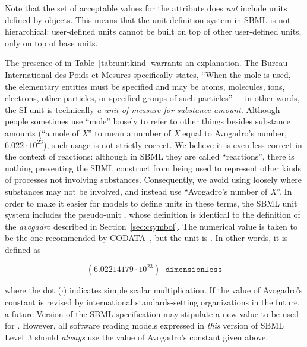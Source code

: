 Note that the set of acceptable values for the attribute
 does \emph{not} include units defined by
\UnitDefinition objects.  This means that the unit definition
system in SBML is not hierarchical: user-defined units cannot be
built on top of other user-defined units, only on top of base
units.

The presence of  in Table~\ref{tab:unitkind}
warrants an explanation.  The Bureau International des Poids et
Mesures specifically states, ``When the mole is used, the
elementary entities must be specified and may be atoms, molecules,
ions, electrons, other particles, or specified groups of such
particles''~\cite[p.~115]{bipm:2006}---in other words, the SI unit
 is technically \emph{a unit of measure for substance
  amount}.  Although people sometimes use ``mole'' loosely to
refer to other things besides substance amounts (\eg ``a mole of
\emph{X}'' to mean a number of \emph{X} equal to Avogadro's
number, $6.022 \cdot 10^{23}$), such usage is not strictly
correct.  We believe it is even less correct in the context of
reactions: although in SBML they are called ``reactions'', there
is nothing preventing the SBML \Reaction construct from being used
to represent other kinds of processes not involving substances.
Consequently, we avoid using  loosely where substances
may not be involved, and instead use ``Avogadro's number of
\emph{X}''.  In order to make it easier for models to define units
in these terms, the SBML unit system includes the pseudo-unit
, whose definition is identical to the definition of
the \emph{avogadro}  described in
Section~\ref{sec:csymbol}.  The numerical value is taken to be the
one recommended by CODATA~\citep{codata_2008}, but the unit is
.  In other words, it is defined as
\begin{linenomath}
  \begin{equation*}
    (6.02214179 \cdot 10^{23}) \cdot \texttt{dimensionless}
  \end{equation*}
\end{linenomath}
where the dot ($\cdot$) indicates simple scalar multiplication.
If the value of Avogadro's constant is revised by international
standards-setting organizations in the future, a future Version of
the SBML \thisL specification may stipulate a new value to be used
for .  However, all software reading models
expressed in \emph{this} version of SBML Level~3 should
\emph{always} use the value of Avogadro's constant given above.

